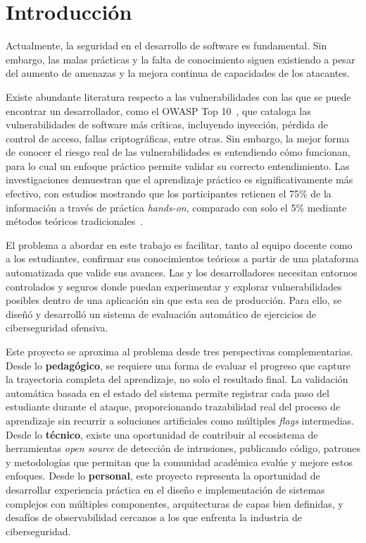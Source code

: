 \chapter{Introducción}
\label{sec:introduccion}

Actualmente, la seguridad en el desarrollo de software es fundamental. Sin
embargo, las malas prácticas y la falta de conocimiento siguen existiendo a
pesar del aumento de amenazas y la mejora continua de capacidades de los
atacantes.

Existe abundante literatura respecto a las vulnerabilidades con las que se puede
encontrar un desarrollador, como el OWASP Top 10~\cite{owasptop10}, que cataloga
las vulnerabilidades de software más críticas, incluyendo inyección, pérdida de
control de acceso, fallas criptográficas, entre otras. Sin embargo, la mejor
forma de conocer el riesgo real de las vulnerabilidades es entendiendo cómo
funcionan, para lo cual un enfoque práctico permite validar su correcto
entendimiento. Las investigaciones demuestran que el aprendizaje práctico es
significativamente más efectivo, con estudios mostrando que los participantes
retienen el 75\% de la información a través de práctica \textit{hands-on},
comparado con solo el 5\% mediante métodos teóricos
tradicionales~\cite{sanshandson}.

El problema a abordar en este trabajo es facilitar, tanto al equipo docente como
a los estudiantes, confirmar sus conocimientos teóricos a partir de una
plataforma automatizada que valide sus avances. Las y los desarrolladores
necesitan entornos controlados y seguros donde puedan experimentar y explorar
vulnerabilidades posibles dentro de una aplicación sin que esta sea de
producción. Para ello, se diseñó y desarrolló un sistema de evaluación
automático de ejercicios de ciberseguridad ofensiva.

Este proyecto se aproxima al problema desde tres perspectivas complementarias.
Desde lo \textbf{pedagógico}, se requiere una forma de evaluar el progreso que
capture la trayectoria completa del aprendizaje, no solo el resultado final. La
validación automática basada en el estado del sistema permite registrar cada
paso del estudiante durante el ataque, proporcionando trazabilidad real del
proceso de aprendizaje sin recurrir a soluciones artificiales como múltiples
\textit{flags} intermedias. Desde lo \textbf{técnico}, existe una oportunidad de
contribuir al ecosistema de herramientas \textit{open source} de detección de
intrusiones, publicando código, patrones y metodologías que permitan que la
comunidad académica evalúe y mejore estos enfoques. Desde lo \textbf{personal},
este proyecto representa la oportunidad de desarrollar experiencia práctica en
el diseño e implementación de sistemas complejos con múltiples componentes,
arquitecturas de capas bien definidas, y desafíos de observabilidad cercanos a
los que enfrenta la industria de ciberseguridad.

